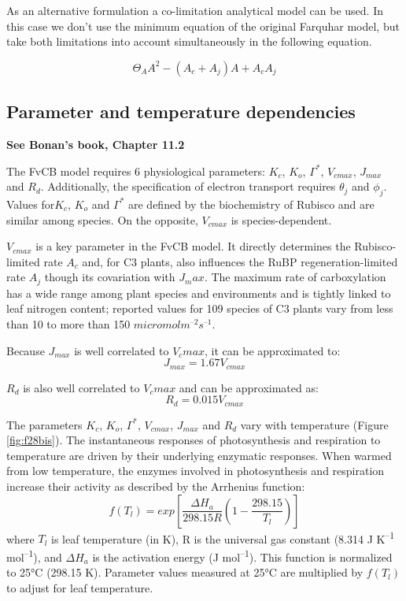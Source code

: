 \documentclass[
  12pt,
  oneside]{book}
\begin{document}
As an alternative formulation a co-limitation analytical model can be used. In this case we don't use the minimum equation of the original Farquhar model, but take both limitations into account simultaneously in the following equation.

\[
\Theta_{A}A^2-(A_c+A_j)A+A_cA_j
\]

\hypertarget{parameter-and-temperature-dependencies}{%
\subsection{Parameter and temperature dependencies}\label{parameter-and-temperature-dependencies}}

\textbf{See Bonan's book, Chapter 11.2}

The FvCB model requires 6 physiological parameters: \(K_c\), \(K_o\), \(\Gamma^*\), \(V_{cmax}\), \(J_{max}\) and \(R_d\). Additionally, the specification of electron transport requires \(\theta_j\) and \(\phi_j\). Values for\(K_c\), \(K_o\) and \(\Gamma^*\) are defined by the biochemistry of Rubisco and are similar among species. On the opposite, \(V_{cmax}\) is species-dependent.

\(V_{cmax}\) is a key parameter in the FvCB model. It directly determines the Rubisco-limited rate \(A_c\) and, for C3 plants, also influences the RuBP regeneration-limited rate \(A_j\) though its covariation with \(J_max\). The maximum rate of carboxylation has a wide range among plant species and environments and is tightly linked to leaf nitrogen content; reported values for 109 species of C3 plants vary from less than 10 to more than 150 \(micromol m^{–2} s^{–1}\).

Because \(J_{max}\) is well correlated to \(V_cmax\), it can be approximated to:
\[
J_{max} = 1.67V_{cmax}
\]

\(R_d\) is also well correlated to \(V_cmax\) and can be approximated as:
\[
R_d=0.015V_{cmax}
\]

The parameters \(K_c\), \(K_o\), \(\Gamma^*\), \(V_{cmax}\), \(J_{max}\) and \(R_d\) vary with temperature (Figure \ref{fig:f28bis}). The instantaneous responses of photosynthesis and respiration to temperature are driven by their underlying enzymatic responses. When warmed from low temperature, the enzymes involved in photosynthesis and respiration increase their activity as described by the Arrhenius function:
\[
f(T_l)=exp\left[\frac{\Delta H_a}{298.15R}(1-\frac{298.15}{T_l})\right]
\]
where \(T_l\) is leaf temperature (in K), R is the universal gas constant (8.314 J K\textsuperscript{--1} mol\textsuperscript{--1}), and \(\Delta H_a\) is the activation energy (J mol\textsuperscript{--1}). This function is normalized to 25°C (298.15 K). Parameter values measured at 25°C are multiplied by \(f(T_l)\) to adjust for leaf temperature.
\end{document}
